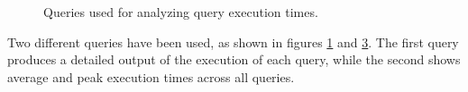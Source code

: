        \begin{figure}
            \centering
            \begin{subfigure}{\textwidth}
                \label{fig:tests:perf:queries:detailed}
            \end{subfigure}
            
            \begin{subfigure}{\textwidth}
                \label{fig:tests:perf:queries:aggregated}
            \end{subfigure}
            
            \caption{Queries used for analyzing query execution times.}
        \end{figure}
        
        Two different queries have been used, as shown in figures \ref{fig:tests:perf:queries:detailed} and \ref{fig:tests:perf:queries:aggregated}.
        The first query produces a detailed output of the execution of each query, while the second shows average and peak execution times across all queries.
        
